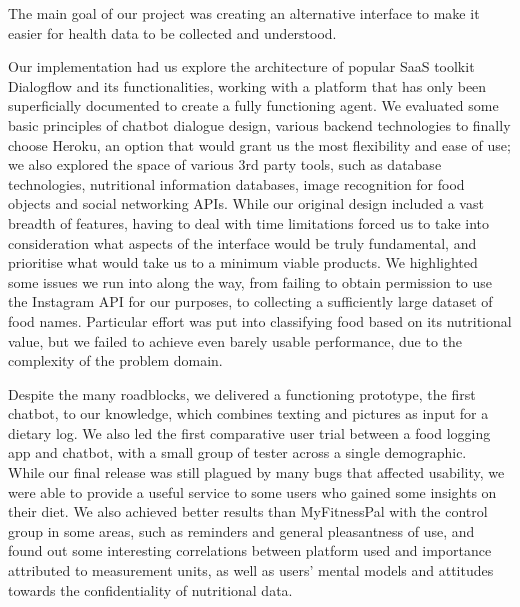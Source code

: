 The main goal of our project was creating an alternative interface to make it easier for health data to be collected and understood.

Our implementation had us explore the architecture of popular SaaS toolkit Dialogflow and its functionalities, working with a platform that has only been superficially documented to create a fully functioning agent. We evaluated some basic principles of chatbot dialogue design, various backend technologies to finally choose Heroku, an option that would grant us the most flexibility and ease of use; we also explored the space of various 3rd party tools, such as database technologies, nutritional information databases, image recognition for food objects and social networking APIs. While our original design included a vast breadth of features, having to deal with time limitations forced us to take into consideration what aspects of the interface would be truly fundamental, and prioritise what would take us to a minimum viable products. We highlighted some issues we run into along the way, from failing to obtain permission to use the Instagram API for our purposes, to collecting a sufficiently large dataset of food names. Particular effort was put into classifying food based on its nutritional value, but we failed to achieve even barely usable performance, due to the complexity of the problem domain.

Despite the many roadblocks, we delivered a functioning prototype, the first chatbot, to our knowledge, which combines texting and pictures as input for a dietary log. We also led the first comparative user trial between a food logging app and chatbot, with a small group of tester across a single demographic. \\
While our final release was still plagued by many bugs that affected usability, we were able to provide a useful service to some users who gained some insights on their diet. We also achieved better results than MyFitnessPal with the control group in some areas, such as reminders and general pleasantness of use, and found out some interesting correlations between platform used and importance attributed to measurement units, as well as users' mental models and attitudes towards the confidentiality of nutritional data. 

